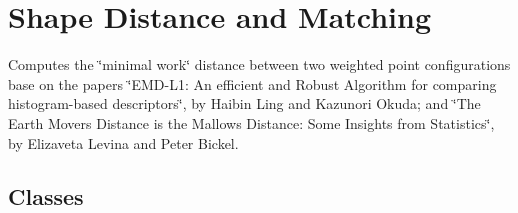 \hypertarget{group__shape}{}\section{Shape Distance and Matching}
\label{group__shape}


Computes the \char`\"{}minimal work\char`\"{} distance between two weighted point configurations base on the papers \char`\"{}\+E\+M\+D-\/\+L1\+: An efficient and Robust Algorithm for comparing histogram-\/based descriptors\char`\"{}, by Haibin Ling and Kazunori Okuda; and \char`\"{}\+The Earth Mover\textquotesingle{}s Distance is the Mallows Distance\+: Some Insights from
\+Statistics\char`\"{}, by Elizaveta Levina and Peter Bickel.  


\subsection*{Classes}
